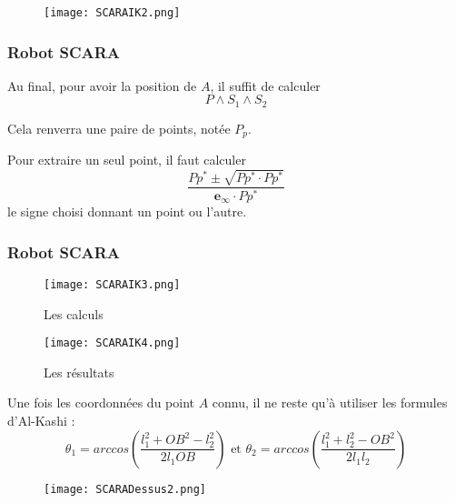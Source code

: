 \documentclass{beamer}
\newcommand{\e}[1]{\bm{e_{#1}}}
\newcommand{\ei}{\e{\infty}}
\begin{document}
\begin{frame}
\vspace*{-0.7cm}
\begin{figure}[!ht]
\hspace*{-1cm}
\texttt{[image: SCARAIK2.png]}
\end{figure}

\end{frame}

\begin{frame}

\frametitle{Robot SCARA}
Au final, pour avoir la position de $A$, il suffit de calculer $$P \wedge S_1 \wedge S_2$$

Cela renverra une paire de points, notée $P_p$. \pause

Pour extraire un seul point, il faut calculer $$\frac{Pp^* \pm \sqrt{Pp^* \cdot Pp^*} }{\ei \cdot Pp^*}$$
le signe choisi donnant un point ou l'autre. 


\end{frame}

\begin{frame}
\frametitle{Robot SCARA}

\begin{figure}[!ht]
    \begin{minipage}[c]{.46\linewidth}
        \centering
        \texttt{[image: SCARAIK3.png]}
        \caption{Les calculs}
    \end{minipage}
    \hfill%
    \begin{minipage}[c]{.46\linewidth}
        \centering
        \texttt{[image: SCARAIK4.png]}
        \caption{Les résultats}
    \end{minipage}
\end{figure}



\end{frame}

\begin{frame}
Une fois les coordonnées du point $A$ connu, il ne reste qu'à utiliser les formules d'Al-Kashi :  
$$\theta_1 = arccos \left(\frac{l_1^2+OB^2-l_2^2}{2 l_1 OB}\right)\text{ et }\theta_2 = arccos \left(\frac{l_1^2+l_2^2-OB^2}{2 l_1 l_2}\right)$$

\begin{figure}[!ht]
\centering
\texttt{[image: SCARADessus2.png]}
\end{figure}
\end{frame}
\end{document}

